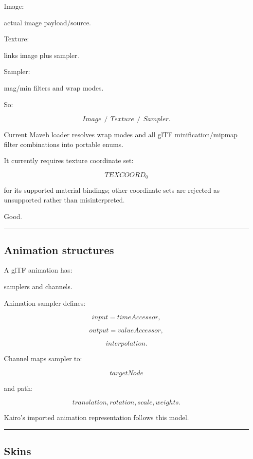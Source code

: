 Image:

actual image payload/source.

Texture:

links image plus sampler.

Sampler:

mag/min filters and wrap modes.

So:

\[
\boxed{
Image
\neq
Texture
\neq
Sampler.
}
\]

Current Maveb loader resolves wrap modes and all glTF minification/mipmap filter combinations into portable enums.

It currently requires texture coordinate set:

\[
TEXCOORD_0
\]

for its supported material bindings; other coordinate sets are rejected as unsupported rather than misinterpreted.

Good.

\begin{center}\rule{0.5\linewidth}{0.5pt}\end{center}

\subsection{Animation structures}\label{04-visual-computing-ii-ch041-animation-structures}

A glTF animation has:

samplers and channels.

Animation sampler defines:

\[
input=timeAccessor,
\]

\[
output=valueAccessor,
\]

\[
interpolation.
\]

Channel maps sampler to:

\[
targetNode
\]

and path:

\[
translation,
rotation,
scale,
weights.
\]

Kairo's imported animation representation follows this model.

\begin{center}\rule{0.5\linewidth}{0.5pt}\end{center}

\subsection{Skins}\label{04-visual-computing-ii-ch041-skins}

